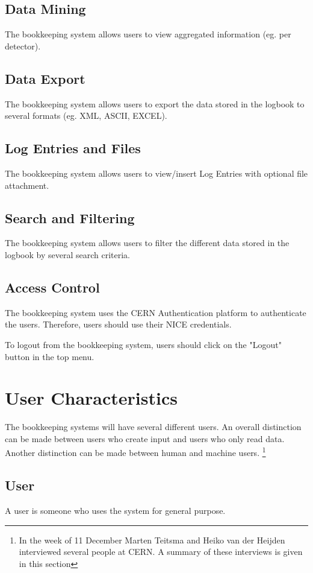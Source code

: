 \subsection{Data Mining}
The bookkeeping system allows users to view aggregated information (eg. per detector).
\subsection{Data Export}
The bookkeeping system allows users to export the data stored in the logbook to several formats (eg. XML, ASCII, EXCEL).
\subsection{Log Entries and Files}
The bookkeeping system allows users to view/insert Log Entries with optional file attachment.

\subsection{Search and Filtering}
The bookkeeping system allows users to filter the different data stored in the logbook by several search criteria.

\subsection{Access Control}
The bookkeeping system uses the CERN Authentication platform to authenticate the users. Therefore, users should use their NICE credentials.

To logout from the bookkeeping system, users should click on the "Logout" button in the top menu.



\section{User Characteristics}
The bookkeeping systems will have several different users. An overall distinction can be made between users who create input and users who only read data. Another distinction can be made between human and machine users. \footnote{In the week of 11 December Marten Teitsma and Heiko van der Heijden interviewed several people at CERN. A summary of these interviews is given in this section}

\subsection{User}
A user is someone who uses the system for general purpose.

